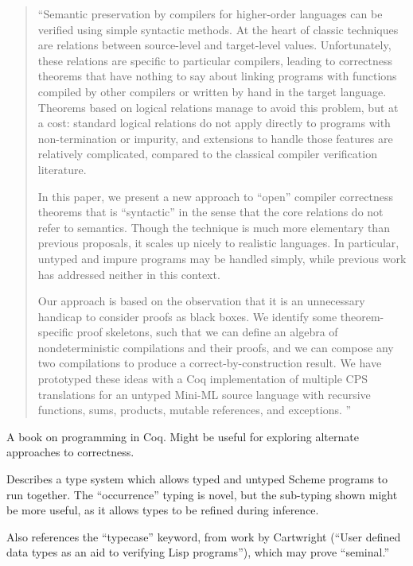 \documentclass[11pt]{article}
\begin{document}
\begin{quote}
``Semantic preservation by compilers for higher-order languages can be
  veriﬁed using simple syntactic methods. At the heart of classic
  techniques are relations between source-level and target-level
  values. Unfortunately, these relations are speciﬁc to particular
  compilers, leading to correctness theorems that have nothing to say
  about linking programs with functions compiled by other compilers or
  written by hand in the target language. Theorems based on logical
  relations manage to avoid this problem, but at a cost: standard
  logical relations do not apply directly to programs with
  non-termination or impurity, and extensions to handle those features
  are relatively complicated, compared to the classical compiler
  veriﬁcation literature.

  In this paper, we present a new approach to ``open'' compiler
  correctness theorems that is ``syntactic'' in the sense that the
  core relations do not refer to semantics. Though the technique is
  much more elementary than previous proposals, it scales up nicely
  to realistic languages. In particular, untyped and impure programs
  may be handled simply, while previous work has addressed neither
  in this context.
  
  Our approach is based on the observation that it is an unnecessary
  handicap to consider proofs as black boxes. We identify some
  theorem-speciﬁc proof skeletons, such that we can deﬁne an algebra
  of nondeterministic compilations and their proofs, and we can
  compose any two compilations to produce a correct-by-construction
  result. We have prototyped these ideas with a Coq implementation
  of multiple CPS translations for an untyped Mini-ML source
  language with recursive functions, sums, products, mutable
  references, and exceptions. ''
\end{quote}


A book on programming in Coq. Might be useful for exploring alternate
approaches to correctness.



Describes a type system which allows typed and untyped Scheme programs
to run together. The ``occurrence'' typing is novel, but the
sub-typing shown might be more useful, as it allows types to be refined
during inference.

Also references the ``typecase'' keyword, from work by Cartwright
(``User defined data types as an aid to verifying Lisp programs''), which may
prove ``seminal.''
\end{document}
